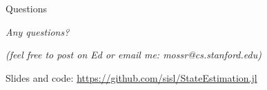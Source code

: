 \begin{frame}[fragile]{Questions}

\begin{center}
    {\LARGE \color{cardinal}\textit{Any questions?}}
\end{center}

\begin{center}
    {\small \textit{(feel free to post on Ed or email me: mossr@cs.stanford.edu)}}
    
    {\small Slides and code: \url{https://github.com/sisl/StateEstimation.jl}}
\end{center}

\end{frame}